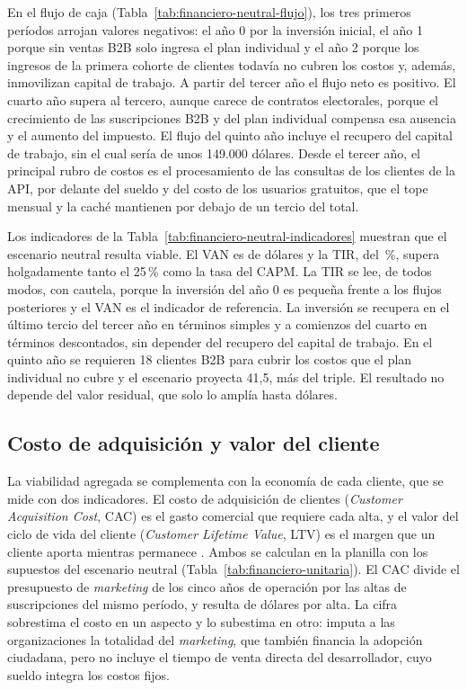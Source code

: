 

En el flujo de caja (Tabla~\ref{tab:financiero-neutral-flujo}), los tres primeros períodos arrojan valores negativos: el año 0 por la inversión inicial, el año 1 porque sin ventas B2B solo ingresa el plan individual y el año 2 porque los ingresos de la primera cohorte de clientes todavía no cubren los costos y, además, inmovilizan capital de trabajo. A partir del tercer año el flujo neto es positivo. El cuarto año supera al tercero, aunque carece de contratos electorales, porque el crecimiento de las suscripciones B2B y del plan individual compensa esa ausencia y el aumento del impuesto. El flujo del quinto año incluye el recupero del capital de trabajo, sin el cual sería de unos 149.000 dólares. Desde el tercer año, el principal rubro de costos es el procesamiento de las consultas de los clientes de la API, por delante del sueldo y del costo de los usuarios gratuitos, que el tope mensual y la caché mantienen por debajo de un tercio del total.



Los indicadores de la Tabla~\ref{tab:financiero-neutral-indicadores} muestran que el escenario neutral resulta viable. El VAN es de \finNeuVan{} dólares y la TIR, del \finNeuTir\,\%, supera holgadamente tanto el 25\,\% como la tasa del CAPM. La TIR se lee, de todos modos, con cautela, porque la inversión del año 0 es pequeña frente a los flujos posteriores y el VAN es el indicador de referencia. La inversión se recupera en el último tercio del tercer año en términos simples y a comienzos del cuarto en términos descontados, sin depender del recupero del capital de trabajo. En el quinto año se requieren 18 clientes B2B para cubrir los costos que el plan individual no cubre y el escenario proyecta 41,5, más del triple. El resultado no depende del valor residual, que solo lo amplía hasta \finNeuVanResidual{} dólares.



\subsection{Costo de adquisición y valor del cliente}

La viabilidad agregada se complementa con la economía de cada cliente, que se mide con dos indicadores. El costo de adquisición de clientes (\textit{Customer Acquisition Cost}, CAC) es el gasto comercial que requiere cada alta, y el valor del ciclo de vida del cliente (\textit{Customer Lifetime Value}, LTV) es el margen que un cliente aporta mientras permanece \parencite{Skok2026}. Ambos se calculan en la planilla con los supuestos del escenario neutral (Tabla~\ref{tab:financiero-unitaria}). El CAC divide el presupuesto de \textit{marketing} de los cinco años de operación por las altas de suscripciones del mismo período, y resulta de \finCac{} dólares por alta. La cifra sobrestima el costo en un aspecto y lo subestima en otro: imputa a las organizaciones la totalidad del \textit{marketing}, que también financia la adopción ciudadana, pero no incluye el tiempo de venta directa del desarrollador, cuyo sueldo integra los costos fijos.


